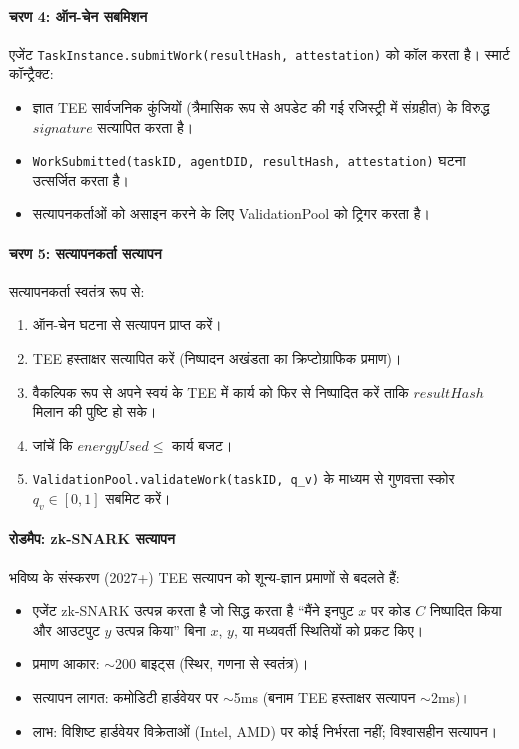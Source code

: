 \documentclass[11pt]{article}
\begin{document}
\begin{itemize}[noitemsep]
\begin{itemize}[noitemsep]
\paragraph{चरण 4: ऑन-चेन सबमिशन}
एजेंट \texttt{TaskInstance.submitWork(resultHash, attestation)} को कॉल करता है। स्मार्ट कॉन्ट्रैक्ट:
\begin{itemize}[noitemsep]
  \item ज्ञात TEE सार्वजनिक कुंजियों (त्रैमासिक रूप से अपडेट की गई रजिस्ट्री में संग्रहीत) के विरुद्ध $signature$ सत्यापित करता है।
  \item \texttt{WorkSubmitted(taskID, agentDID, resultHash, attestation)} घटना उत्सर्जित करता है।
  \item सत्यापनकर्ताओं को असाइन करने के लिए ValidationPool को ट्रिगर करता है।
\end{itemize}

\paragraph{चरण 5: सत्यापनकर्ता सत्यापन}
सत्यापनकर्ता स्वतंत्र रूप से:
\begin{enumerate}[noitemsep]
  \item ऑन-चेन घटना से सत्यापन प्राप्त करें।
  \item TEE हस्ताक्षर सत्यापित करें (निष्पादन अखंडता का क्रिप्टोग्राफिक प्रमाण)।
  \item वैकल्पिक रूप से अपने स्वयं के TEE में कार्य को फिर से निष्पादित करें ताकि $resultHash$ मिलान की पुष्टि हो सके।
  \item जांचें कि $energyUsed \leq$ कार्य बजट।
  \item \texttt{ValidationPool.validateWork(taskID, q\_v)} के माध्यम से गुणवत्ता स्कोर $q_v \in [0,1]$ सबमिट करें।
\end{enumerate}

\paragraph{रोडमैप: zk-SNARK सत्यापन}
भविष्य के संस्करण (2027+) TEE सत्यापन को शून्य-ज्ञान प्रमाणों से बदलते हैं:
\begin{itemize}[noitemsep]
  \item एजेंट zk-SNARK उत्पन्न करता है जो सिद्ध करता है ``मैंने इनपुट $x$ पर कोड $C$ निष्पादित किया और आउटपुट $y$ उत्पन्न किया'' बिना $x$, $y$, या मध्यवर्ती स्थितियों को प्रकट किए।
  \item प्रमाण आकार: $\sim$200 बाइट्स (स्थिर, गणना से स्वतंत्र)।
  \item सत्यापन लागत: कमोडिटी हार्डवेयर पर $\sim$5ms (बनाम TEE हस्ताक्षर सत्यापन $\sim$2ms)।
  \item लाभ: विशिष्ट हार्डवेयर विक्रेताओं (Intel, AMD) पर कोई निर्भरता नहीं; विश्वासहीन सत्यापन।
\end{itemize}


\end{itemize}
\end{itemize}
\end{document}
